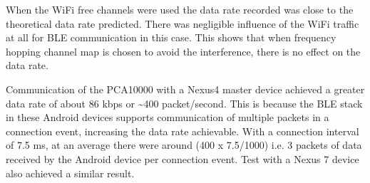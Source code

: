 When the WiFi free channels were used the data rate recorded was close to the theoretical data rate predicted. There was negligible influence of the WiFi traffic at all for BLE communication in this case. This shows that when frequency hopping channel map is chosen to avoid the interference, there is no effect on the data rate.

Communication of the PCA10000 with a Nexus4 master device achieved a greater data rate of about 86 kbps or \textasciitilde400 packet/second. This is because the BLE stack in these Android devices supports communication of multiple packets in a connection event, increasing the data rate achievable. With a connection interval of 7.5 ms, at an average there were around (400 x 7.5/1000) i.e. 3 packets of data received by the Android device per connection event. Test with a Nexus 7 device also achieved a similar result.
%
%

